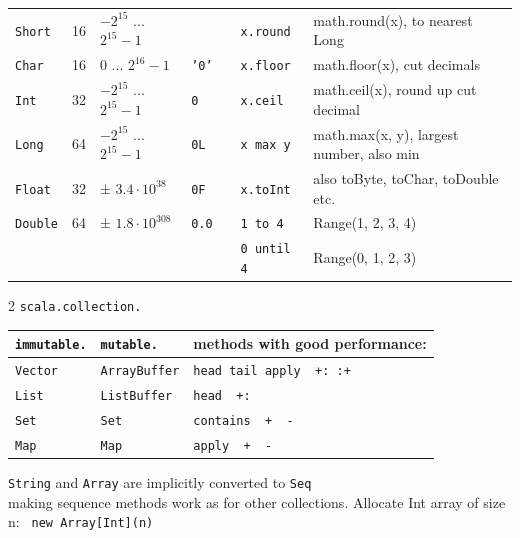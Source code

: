 \documentclass[article, a5paper]{memoir}
\newcommand{\LangColor}{red}
\newcommand{\head}[1]{{\bfseries {\color{\LangColor}{#1}}\par\vspace{1mm}\hrule\vspace{-2mm}}}
\renewcommand{\arraystretch}{0.9}
\newcommand{\code}{\lstinline[basicstyle=\ttfamily]}
\newcommand{\Newline}{\vspace{\baselineskip}}
\begin{document}
{{\begin{tabular}{@{}l l l l p{2mm} | l l}
\texttt{Short}  &  16 & $-2^{15}$ ... $2^{15}-1$ &   &  
& \code|x.round| & math.round(x), to nearest Long\\

\texttt{Char}   &  16 & $0$ ... $2^{16}-1$ & \texttt{'0'} &  
& \code|x.floor| & math.floor(x), cut decimals\\

\texttt{Int}    &  32 & $-2^{15}$ ... $2^{15}-1$ & \texttt{0} & 
& \code|x.ceil| & math.ceil(x), round up cut decimal\\

\texttt{Long}   &  64 & $-2^{15}$ ... $2^{15}-1$ & \texttt{0L} & 
& \code|x max y| & math.max(x, y), largest number, also min\\

\texttt{Float}  &  32 & ± $3.4 \cdot 10^{38}$  & \texttt{0F} &
& \code|x.toInt| & also toByte, toChar, toDouble etc.\\

\texttt{Double} &  64 & ± $1.8 \cdot 10^{308}$ & \texttt{0.0} & 
& \code|1 to 4| & Range(1, 2, 3, 4) \\
 & & & & 
 & \code|0 until 4| & Range(0, 1, 2, 3) \\
\end{tabular}
}



\Newline\head{The Scala Standard Collection Library}
{
\small\renewcommand{\arraystretch}{1.1}
\begin{multicols}{2}
\texttt{scala.collection.}
\begin{tabular}{@{}l l l}
\texttt{immutable.} & \texttt{mutable.} & methods with good performance: \\
\hline
\texttt{Vector} & \texttt{ArrayBuffer} & \texttt{head tail apply~~+: :+}\\
\texttt{List} &  \texttt{ListBuffer} &  \texttt{head~~+:}  \\
\texttt{Set} & \texttt{Set} & \texttt{contains~~+~~-}\\
\texttt{Map} & \texttt{Map} & \texttt{apply~~+~~-} \\
\end{tabular}

\vspace{0.2em}

\texttt{String} and \texttt{Array} are implicitly converted to \texttt{Seq}\\ making sequence methods work as for other collections. Allocate Int array of size n: \code{ new Array[Int](n)}



\end{multicols}}}
\end{document}
